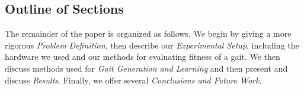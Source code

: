 \subsection{Outline of Sections}


The remainder of the paper is organized as follows. We begin by giving
a more rigorous \emph{Problem Definition}, then describe our
\emph{Experimental Setup}, including the hardware we used and our
methods for evaluating fitness of a gait. We then discuss methods used
for \emph{Gait Generation and Learning} and then present and discuss
\emph{Results}.  Finally, we offer several \emph{Conclusions and
  Future Work}.

